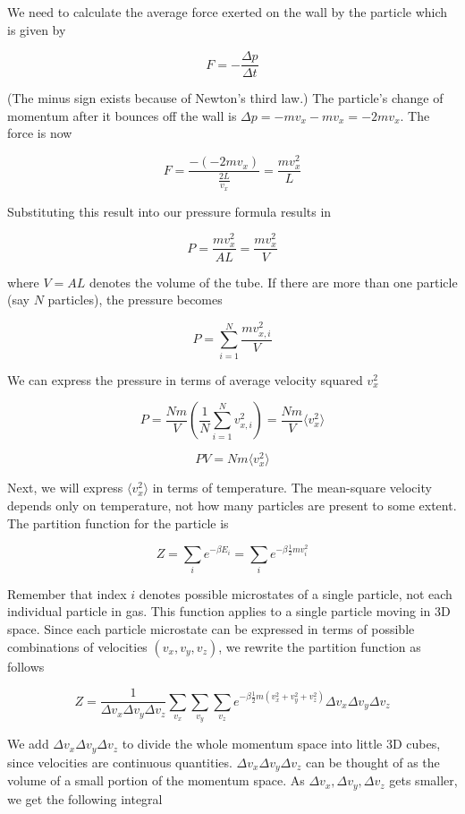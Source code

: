 \documentclass[12pt, a4paper]{article}
\begin{document}
We need to calculate the average force exerted on the wall by the particle which is given by

$$F=-\frac{\Delta p}{\Delta t}$$

(The minus sign exists because of Newton's third law.) The particle's change of momentum after it bounces off the wall is $\Delta p = -mv_x-mv_x=-2mv_x$. The force is now

$$F=\frac{-\left( -2mv_x \right)}{\frac{2L}{v_x}}=\frac{mv_x^2}{L}$$

Substituting this result into our pressure formula results in

$$P=\frac{mv_x^2}{AL}=\frac{mv_x^2}{V}$$

where $V=AL$ denotes the volume of the tube. If there are more than one particle (say $N$ particles), the pressure becomes

$$P=\sum_{i=1}^N \frac{mv_{x,i}^2}{V}$$

We can express the pressure in terms of average velocity squared $v_x^2$

$$P=\frac{Nm}{V} \left(\frac{1}{N} \sum_{i=1}^N v_{x,i}^2 \right) = \frac{Nm}{V} \langle v_x^2 \rangle$$

$$PV=Nm\langle v_x^2 \rangle$$

Next, we will express $\langle v_x^2 \rangle$ in terms of temperature. The mean-square velocity depends only on temperature, not how many particles are present to some extent. The partition function for the particle is

$$Z=\sum_{i} e^{-\beta E_i}=\sum_{i} e^{-\beta \frac{1}{2}mv_i^2}$$

Remember that index $i$ denotes possible microstates of a single particle, not each individual particle in gas. This function applies to a single particle moving in 3D space. Since each particle microstate can be expressed in terms of possible combinations of velocities $(v_x,v_y,v_z)$, we rewrite the partition function as follows

$$Z = \frac{1}{\Delta v_x \Delta v_y \Delta v_z} \sum_{v_x} \sum_{v_y} \sum_{v_z} e^{-\beta \frac{1}{2}m (v_x^2+v_y^2+v_z^2)} \Delta v_x \Delta v_y \Delta v_z$$

We add $\Delta v_x \Delta v_y \Delta v_z$ to divide the whole momentum space into little 3D cubes, since velocities are continuous quantities. $\Delta v_x \Delta v_y \Delta v_z$ can be thought of as the volume of a small portion of the momentum space. As $\Delta v_x, \Delta v_y, \Delta v_z$ gets smaller, we get the following integral
\end{document}

